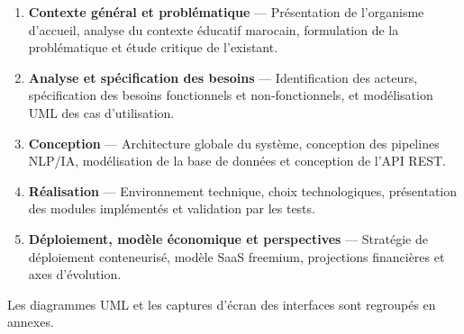 \begin{enumerate}[label=\textbf{Chapitre~\arabic* :}]
  \item \textbf{Contexte général et problématique} — Présentation de l'organisme d'accueil, analyse du contexte éducatif marocain, formulation de la problématique et étude critique de l'existant.
  \item \textbf{Analyse et spécification des besoins} — Identification des acteurs, spécification des besoins fonctionnels et non-fonctionnels, et modélisation UML des cas d'utilisation.
  \item \textbf{Conception} — Architecture globale du système, conception des pipelines NLP/IA, modélisation de la base de données et conception de l'API REST.
  \item \textbf{Réalisation} — Environnement technique, choix technologiques, présentation des modules implémentés et validation par les tests.
  \item \textbf{Déploiement, modèle économique et perspectives} — Stratégie de déploiement conteneurisé, modèle SaaS freemium, projections financières et axes d'évolution.
\end{enumerate}

Les diagrammes UML et les captures d'écran des interfaces sont regroupés en annexes.
